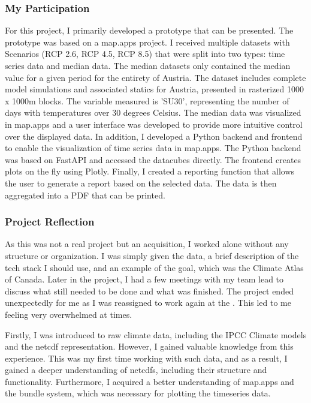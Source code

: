 \documentclass[11pt, titlepage, a4paper]{article}
\begin{document}
\subsubsection{My Participation}
For this project, I primarily developed a prototype that can be presented. The prototype was based on a map.apps project.    I received multiple datasets with  Scenarios (RCP 2.6, RCP 4.5, RCP 8.5) that were split into two types: time series data and median data. The median datasets only contained the median value for a given period for the entirety of Austria. The dataset includes complete model simulations and associated statics for Austria, presented in rasterized 1000 x 1000m blocks. The variable measured is 'SU30', representing the number of days with temperatures over 30 degrees Celsius.
The median data was visualized in map.apps and a user interface was developed to provide more intuitive control over the displayed data. In addition, I developed a Python backend and frontend to enable the visualization of time series data in map.apps. The Python backend was based on FastAPI and accessed the datacubes directly. The frontend creates plots on the fly using Plotly. Finally, I created a reporting function that allows the user to generate a report based on the selected data. The data is then aggregated into a PDF that can be printed.

\subsubsection{Project Reflection}
As this was not a real project but an acquisition, I worked alone without any structure or organization.  I was simply given the data, a brief description of the tech stack I should use, and an example of the goal, which was the Climate Atlas of Canada. Later in the project, I had a few meetings with my team lead to discuss what still needed to be done and what was finished. The project ended unexpectedly for me as I was reassigned to work again at the . This led to me feeling very overwhelmed at times.

Firstly, I was introduced to raw climate data, including the IPCC Climate models and the netcdf representation. However, I gained valuable knowledge from this experience. This was my first time working with such data, and as a result, I gained a deeper understanding of netcdfs, including their structure and functionality. Furthermore, I acquired a better understanding of map.apps and the bundle system, which was necessary for plotting the timeseries data.
\end{document}
